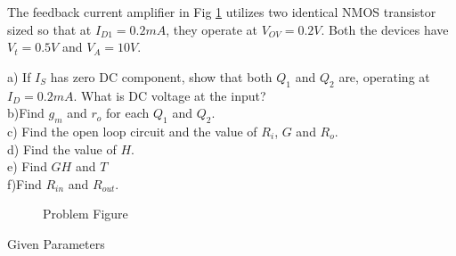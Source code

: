 The feedback current amplifier in Fig \ref{fig:ee18btech11038_probfig} utilizes two identical NMOS transistor sized so that at $I_{D1} = 0.2mA$, they operate at $V_{OV} = 0.2V$. Both the devices have $V_{t} =0.5V$ and $V_{A} = 10V$.




a) If $I_{S}$ has zero DC component, show that both $Q_{1}$ and $Q_{2}$ are, operating at $I_{D} = 0.2mA$. What is DC voltage at the input?
\\
b)Find $g_{m}$ and $r_{o}$ for each $Q_{1}$ and $Q_{2}$.
\\
c) Find the open loop circuit and the value of $R_{i}$, $G$ and $R_{o}$.
\\
d) Find the value of $H$.
\\
e) Find $GH$ and $T$
\\
f)Find $R_{in}$ and $R_{out}$.
\renewcommand{\thefigure}{\theenumi.\arabic{figure}}
\begin{figure}[!ht]
	\begin{center}
		
		\resizebox{\columnwidth}{!}{}
	\end{center}
\caption{Problem Figure}
\label{fig:ee18btech11038_probfig}
\end{figure}

\begin{table}[!ht]
\centering

\caption{Given Parameters}
\label{table: given}
\end{table}

